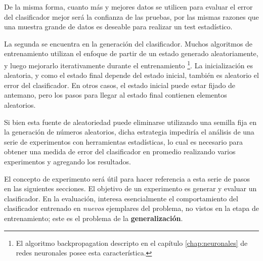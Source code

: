 De la misma forma, cuanto más y mejores datos se utilicen para evaluar el error del clasificador mejor será la confianza de las pruebas, por las mismas razones que una muestra grande de datos es deseable para realizar un test estadístico.

La segunda se encuentra en la generación del clasificador. Muchos algoritmos de entrenamiento utilizan el enfoque de partir de un estado generado aleatoriamente, y luego mejorarlo iterativamente durante el entrenamiento \footnote{El algoritmo backpropagation descripto en el capítulo \ref{chap:neuronales} de redes neuronales posee esta característica.}. La inicialización es aleatoria, y como el estado final depende del estado inicial, también es aleatorio el error del clasificador. En otros casos, el estado inicial puede estar fijado de antemano, pero los pasos para llegar al estado final contienen elementos aleatorios.

Si bien esta fuente de aleatoriedad puede eliminarse utilizando una semilla fija en la generación de números aleatorios, dicha estrategia impediría el análisis de una serie de experimentos con herramientas estadísticas, lo cual es necesario para obtener una medida de error del clasificador en promedio realizando varios experimentos y agregando los resultados. 

El concepto de experimento será útil para hacer referencia a esta serie de pasos en las siguientes secciones. El objetivo de un experimento es generar y evaluar un clasificador. En la evaluación, interesa esencialmente el comportamiento del clasificador entrenado en \textit{nuevos} ejemplares del problema, no vistos en la etapa de entrenamiento; este es el problema de la \textbf{generalización}.